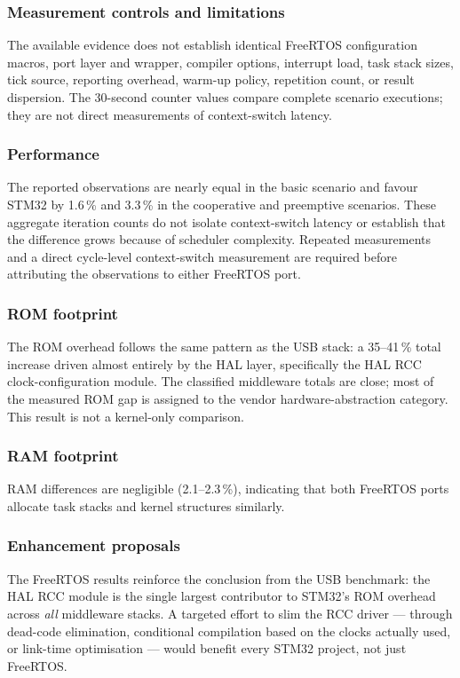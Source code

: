 \subsubsection*{Measurement controls and limitations}
The available evidence does not establish identical FreeRTOS configuration macros, port
layer and wrapper, compiler options, interrupt load, task stack sizes, tick source,
reporting overhead, warm-up policy, repetition count, or result dispersion. The 30-second
counter values compare complete scenario executions; they are not direct measurements of
context-switch latency.

\subsubsection*{Performance}
The reported observations are nearly equal in the basic scenario and favour STM32 by
1.6\,\% and 3.3\,\% in the cooperative and preemptive scenarios. These aggregate iteration
counts do not isolate context-switch latency or establish that the difference grows because
of scheduler complexity. Repeated measurements and a direct cycle-level context-switch
measurement are required before attributing the observations to either FreeRTOS port.

\subsubsection*{ROM footprint}
The ROM overhead follows the same pattern as the USB stack: a 35--41\,\% total increase
driven almost entirely by the HAL layer, specifically the HAL RCC clock-configuration
module. The classified middleware totals are close; most of the measured ROM gap is assigned
to the vendor hardware-abstraction category. This result is not a kernel-only comparison.

\subsubsection*{RAM footprint}
RAM differences are negligible (2.1--2.3\,\%), indicating that both FreeRTOS ports allocate
task stacks and kernel structures similarly.

\subsubsection*{Enhancement proposals}
The FreeRTOS results reinforce the conclusion from the USB benchmark: the HAL RCC module
is the single largest contributor to STM32's ROM overhead across \emph{all} middleware
stacks. A targeted effort to slim the RCC driver --- through dead-code elimination,
conditional compilation based on the clocks actually used, or link-time optimisation ---
would benefit every STM32 project, not just FreeRTOS.

